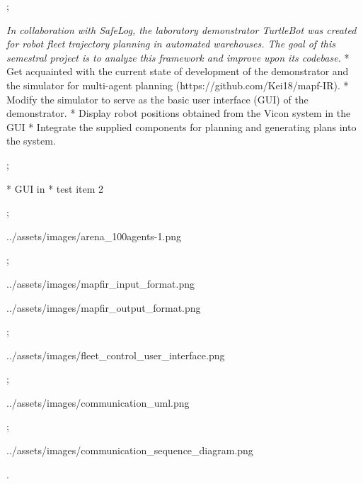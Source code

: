 

\worktype[B/EN]
\slideshow



\pg;


\textit {
    In collaboration with SafeLog, the laboratory demonstrator TurtleBot was created
    for robot fleet trajectory planning in automated warehouses. The goal of this semestral
    project is to analyze this framework and improve upon its codebase.
}
\begitems
* Get acquainted with the current state of development of the demonstrator and the simulator for multi-agent planning (https://github.com/Kei18/mapf-IR).
* Modify the simulator to serve as the basic user interface (GUI) of the demonstrator.
* Display robot positions obtained from the Vicon system in the GUI
* Integrate the supplied components for planning and generating plans into the system.
\enditems
\nl

\pg;






\begitems
* GUI in 
* test item 2
\enditems
\nl

\pg;



\centerline{\picw=14cm \inspic ../assets/images/arena_100agents-1.png}

\pg;


\centerline{\picw=5cm \inspic ../assets/images/mapfir_input_format.png}
\centerline{\picw=5cm \inspic ../assets/images/mapfir_output_format.png}

\pg;


\centerline{\picw=5cm \inspic ../assets/images/fleet_control_user_interface.png}

\pg;


\centerline{\picw=5cm \inspic ../assets/images/communication_uml.png}

\pg;


\centerline{\picw=5cm \inspic ../assets/images/communication_sequence_diagram.png}

\pg.

